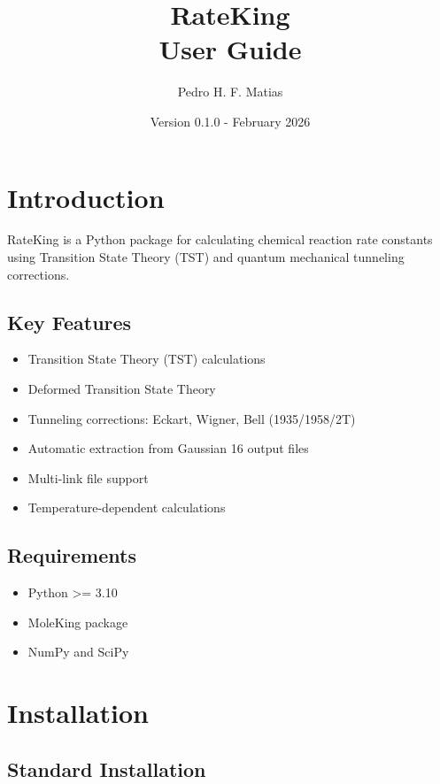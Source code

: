 \documentclass[11pt,a4paper]{book}
\title{\Huge \textbf{RateKing}\\\Large User Guide}
\author{Pedro H. F. Matias}
\date{Version 0.1.0 - February 2026}
\begin{document}
\maketitle

\tableofcontents
\newpage

\chapter{Introduction}

RateKing is a Python package for calculating chemical reaction rate constants using Transition State Theory (TST) and quantum mechanical tunneling corrections.

\section{Key Features}

\begin{itemize}
  \item Transition State Theory (TST) calculations
  \item Deformed Transition State Theory
  \item Tunneling corrections: Eckart, Wigner, Bell (1935/1958/2T)
  \item Automatic extraction from Gaussian 16 output files
  \item Multi-link file support
  \item Temperature-dependent calculations
\end{itemize}

\section{Requirements}

\begin{itemize}
  \item Python >= 3.10
  \item MoleKing package
  \item NumPy and SciPy
\end{itemize}

\chapter{Installation}

\section{Standard Installation}
\end{document}
